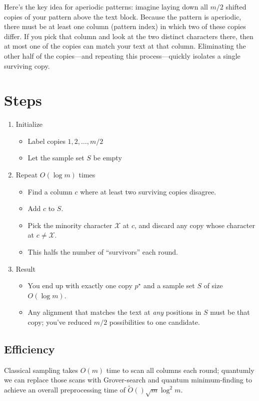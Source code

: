 \documentclass[11pt]{article}
\begin{document}
Here's the key idea for aperiodic patterns: imagine laying down all \(m/2\) shifted copies of your pattern above the text block. Because the pattern is aperiodic, there must be at least one column (pattern index) in which two of these copies differ. If you pick that column and look at the two distinct characters there, then at most one of the copies can match your text at that column. Eliminating the other half of the copies—and repeating this process—quickly isolates a single surviving copy.

\section*{Steps}
\begin{enumerate}
  \item Initialize \begin{itemize}
          \item Label copies \(1, 2, \dots, m/2\)
          \item Let the sample set \(S\) be empty
        \end{itemize}
  \item Repeat \(O(\log m)\) times \begin{itemize}
          \item Find a column \(c\) where at least two surviving copies disagree.
          \item Add \(c\) to \(S\).
          \item Pick the minority character \(\mathcal{X}\) at \(c\), and discard any copy whose character at \(c \neq \mathcal{X}\).
          \item This halfs the number of ``survivors'' each round.
        \end{itemize}
  \item Result \begin{itemize}
          \item You end up with exactly one copy \(p^\star\) and a sample set \(S\) of size \(O(\log m)\).
          \item Any alignment that matches the text at \textit{any} positions in \(S\) must be that copy; you've reduced \(m/2\) possibilities to one candidate.
        \end{itemize}
\end{enumerate}

\subsection*{Efficiency}
Classical sampling takes \(O(m)\) time to scan all columns each round; quantumly we can replace those scans with Grover-search and quantum minimum-finding to achieve an overall preprocessing time of \(\widetilde{O}()\sqrt{m} \log^2 m\).
\end{document}

